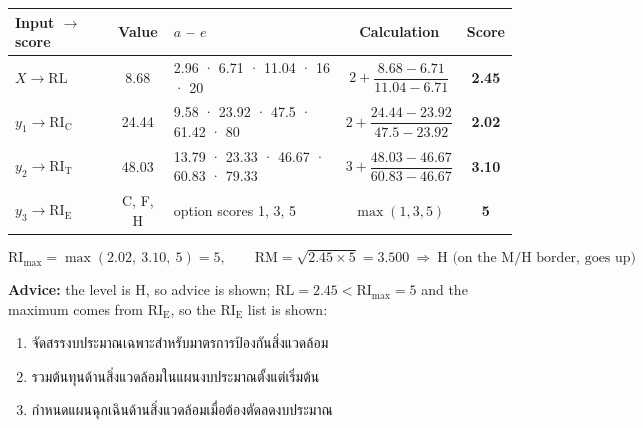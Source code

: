 \documentclass[10pt,a4paper]{article}
\newcommand{\RL}{\mathrm{RL}}\newcommand{\RIC}{\mathrm{RI_C}}\newcommand{\RIT}{\mathrm{RI_T}}\newcommand{\RIE}{\mathrm{RI_E}}
\newcommand{\RImax}{\mathrm{RI}_{\max}}\newcommand{\RM}{\mathrm{RM}}
\begin{document}
\begin{center}
\renewcommand{\arraystretch}{1.3}
\begin{tabular}{@{}l c l c c@{}}
\toprule
Input $\to$ score & Value & $a$ -- $e$ & Calculation & Score\\\midrule
$X\to\RL$ & 8.68 & 2.96 · 6.71 · 11.04 · 16 · 20 & $2+\dfrac{8.68-6.71}{11.04-6.71}$ & \textbf{2.45}\\[8pt]
$y_1\to\RIC$ & 24.44 & 9.58 · 23.92 · 47.5 · 61.42 · 80 & $2+\dfrac{24.44-23.92}{47.5-23.92}$ & \textbf{2.02}\\[8pt]
$y_2\to\RIT$ & 48.03 & 13.79 · 23.33 · 46.67 · 60.83 · 79.33 & $3+\dfrac{48.03-46.67}{60.83-46.67}$ & \textbf{3.10}\\[8pt]
$y_3\to\RIE$ & C, F, H & option scores 1, 3, 5 & $\max(1,3,5)$ & \textbf{5}\\
\bottomrule
\end{tabular}
\[ \RImax=\max(2.02,\ 3.10,\ 5)=5,\qquad \RM=\sqrt{2.45\times5}=3.500\ \Rightarrow\ \text{H (on the M/H border, goes up)} \]
\end{center}
\textbf{Advice:} the level is H, so advice is shown; $\RL=2.45<\RImax=5$ and the maximum comes from $\RIE$, so the $\RIE$ list is shown:
\begin{enumerate}[leftmargin=2em]
\item จัดสรรงบประมาณเฉพาะสำหรับมาตรการป้องกันสิ่งแวดล้อม
\item รวมต้นทุนด้านสิ่งแวดล้อมในแผนงบประมาณตั้งแต่เริ่มต้น
\item กำหนดแผนฉุกเฉินด้านสิ่งแวดล้อมเมื่อต้องตัดลดงบประมาณ
\end{enumerate}
\end{document}
